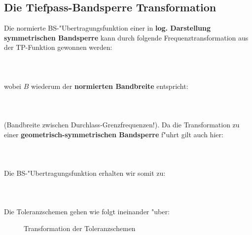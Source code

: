 \subsection{Die Tiefpass-Bandsperre Transformation}
Die normierte BS-"Ubertragungsfunktion einer in {\bf log. Darstellung
symmetrischen Bandsperre} kann durch folgende Frequenztransformation aus der TP-Funktion gewonnen werden:\\~~\\
\\~~\\
wobei $B$ wiederum der {\bf normierten Bandbreite} entspricht:\\~~\\
\\~~\\
(Bandbreite zwischen Durchlass-Grenzfrequenzen!). Da die Transformation zu einer {\bf geometrisch-symmetrischen Bandsperre} f"uhrt gilt auch hier:\\~~\\
\\~~\\
Die BS-"Ubertragungsfunktion erhalten wir somit zu:\\~~\\
\\~~\\
Die Toleranzschemen gehen wie folgt ineinander "uber:
\begin{figure}[!htb]
\vspace*{-3mm}
\begin{center}
  \caption{Transformation der Toleranzschemen}
\end{center}
\vspace*{-6mm}
\end{figure}\\
